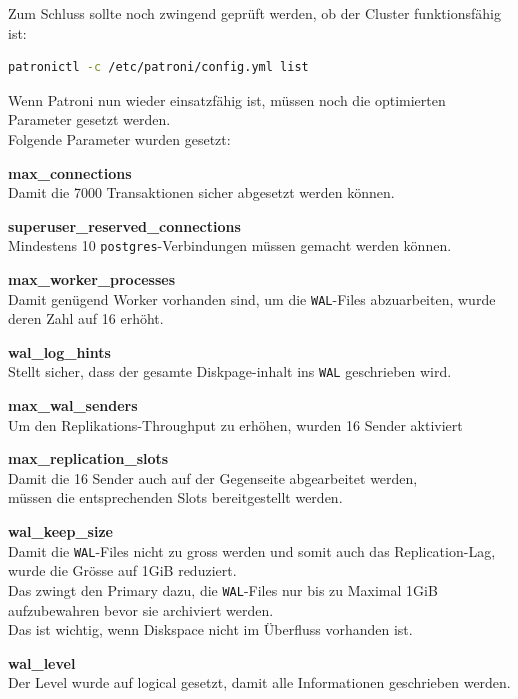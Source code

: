 Zum Schluss sollte noch zwingend geprüft werden, ob der Cluster funktionsfähig ist:
\lstset{style=gra_codestyle}
\begin{lstlisting}[language=bash, caption=Patroni - 250GiB Finaler Check,captionpos=b,label={lst:patroni_250gib_final_check},breaklines=true]
patronictl -c /etc/patroni/config.yml list
\end{lstlisting}

Wenn Patroni nun wieder einsatzfähig ist, müssen noch die optimierten Parameter gesetzt werden.\\
Folgende Parameter wurden gesetzt:\\
\begin{description}
    \item \textbf{max\_connections}\hfill \\Damit die 7000 Transaktionen sicher abgesetzt werden können.
    \item \textbf{superuser\_reserved\_connections}\hfill \\Mindestens 10 \texttt{postgres}-Verbindungen müssen gemacht werden können.
    \item \textbf{max\_worker\_processes}\hfill \\Damit genügend Worker vorhanden sind, um die \texttt{WAL}-Files abzuarbeiten, wurde deren Zahl auf 16 erhöht.
    \item \textbf{wal\_log\_hints}\hfill \\Stellt sicher, dass der gesamte Diskpage-inhalt ins \texttt{WAL} geschrieben wird.
    \item \textbf{max\_wal\_senders}\hfill \\Um den Replikations-Throughput zu erhöhen, wurden 16 Sender aktiviert
    \item \textbf{max\_replication\_slots}\hfill \\Damit die 16 Sender auch auf der Gegenseite abgearbeitet werden,\\müssen die entsprechenden Slots bereitgestellt werden.
    \item \textbf{wal\_keep\_size}\hfill \\Damit die \texttt{WAL}-Files nicht zu gross werden und somit auch das Replication-Lag,\\wurde die Grösse auf 1GiB reduziert.\\Das zwingt den Primary dazu, die \texttt{WAL}-Files nur bis zu Maximal 1GiB aufzubewahren bevor sie archiviert werden.\\Das ist wichtig, wenn Diskspace nicht im Überfluss vorhanden ist.
    \item \textbf{wal\_level}\hfill \\Der Level wurde auf logical gesetzt, damit alle Informationen geschrieben werden.

\end{description}
